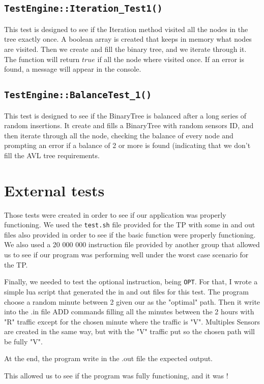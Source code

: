 \documentclass[10pt]{article}
\begin{document}
\subsection{\tt TestEngine::Iteration\_Test1()}
This test is designed to see if the Iteration method visited all the nodes in the tree exactly once. A boolean array is created that keeps in memory what nodes are visited. Then we create and fill the binary tree, and we iterate through it. The function will return $true$ if all the node where visited once. If an error is found, a message will appear in the console.

\subsection{\tt TestEngine::BalanceTest\_1()}
This test is designed to see if the BinaryTree is balanced after a long series of random insertions. It create and fills a BinaryTree with random sensors ID, and then iterate through all the node, checking the balance of every node and prompting an error if a balance of 2 or more is found (indicating that we don't fill the AVL tree requirements.

\section{External tests}
Those tests were created in order to see if our application was properly functioning. We used the \texttt{test.sh} file provided for the TP with some in and out files also provided in order to see if the basic function were properly functioning. We also used a 20 000 000 instruction file provided by another group that allowed us to see if our program was performing well under the worst case scenario for the TP.

Finally, we needed to test the optional instruction, being \texttt{OPT}. For that, I wrote a simple lua script that generated the in and out files for this test. The program choose a random minute between 2 given our as the "optimal" path. Then it write into the .in file ADD commands filling all the minutes between the 2 hours with "R" traffic except for the chosen minute where the traffic is "V". Multiples Sensors are created in the same way, but with the "V" traffic put so the chosen path will be fully "V".

At the end, the program write in the .out file the expected output.

This allowed us to see if the program was fully functioning, and it was !
\end{document}
